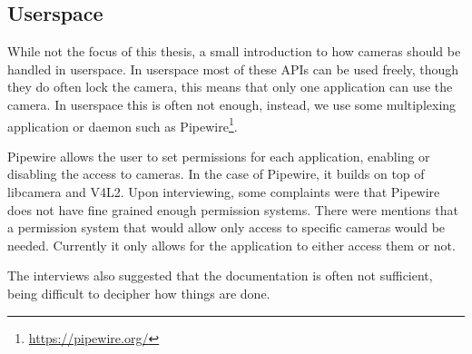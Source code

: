 \subsection{Userspace}\label{section:userspace}
While not the focus of this thesis, a small introduction to how cameras should
be handled in userspace. In userspace most of these APIs can be used freely,
though they do often lock the camera, this means that only one application can
use the camera. In userspace this is often not enough, instead, we use some
multiplexing application or daemon such as Pipewire\footnote{\url{https://pipewire.org/}}.

Pipewire allows the user to set permissions for each application, enabling or
disabling the access to cameras. In the case of Pipewire, it builds on top of
libcamera and V4L2. Upon interviewing, some complaints were that Pipewire does
not have fine grained enough permission systems. There were mentions that a
permission system that would allow only access to specific cameras would be
needed. Currently it only allows for the application to either access them or
not.

The interviews also suggested that the documentation is often not sufficient,
being difficult to decipher how things are done.

